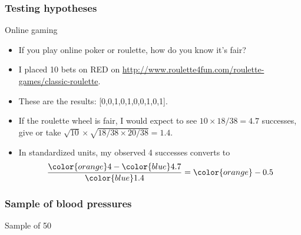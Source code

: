 \documentclass[handout]{beamer}
\begin{document}
   \begin{frame} \frametitle{Testing hypotheses}

   \begin{block}
   {Online gaming}
   \begin{itemize}
   \item If you play online poker or roulette, how do you know it's fair?

   \item I placed 10 bets on {\color{red} RED} on
   \href{http://www.roulette4fun.com/roulette-games/classic-roulette}{http://www.roulette4fun.com/roulette-games/classic-roulette}.

   \item These are the results: [0,0,1,0,1,0,0,1,0,1].

   \item If the roulette wheel is fair,
   I would expect to see $10 \times 18/ 38=4.7$ successes, give or take
   $\sqrt{10} \times \sqrt{18/38 \times 20/38}=1.4$.

   \item In standardized units, my observed 4 successes converts to
   $$
   \frac{{\color{orange} 4} - {\color{blue} 4.7}}{{\color{blue} 1.4}} = {\color{orange} -0.5}
   $$

   \end{itemize}
   \end{block}
   \end{frame}



   \begin{frame}
   \frametitle{Sample of blood pressures}
   \begin{center}
   \end{center}
   Sample of 50
   \end{frame}
\end{document}
